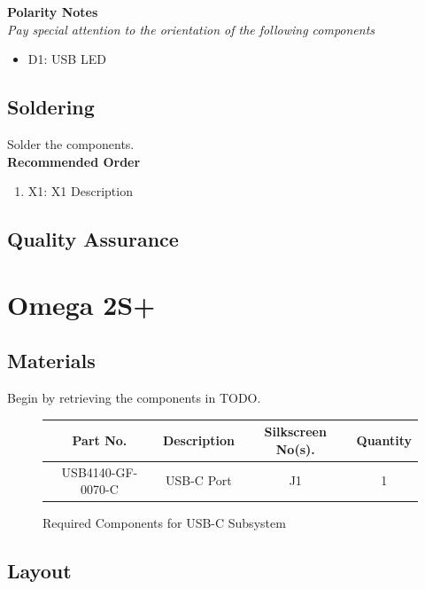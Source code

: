 \documentclass{article}
\begin{document}
\noindent \textbf{Polarity Notes}\\
\noindent \textit{Pay special attention to the orientation of the following components}
\begin{itemize}
  \item D1: USB LED
\end{itemize}

\subsection{Soldering}

Solder the components. \\

\noindent \textbf{Recommended Order}

\begin{enumerate}
  \item X1: X1 Description
\end{enumerate}
\subsection{Quality Assurance}

\section{Omega 2S+}

\subsection{Materials}
Begin by retrieving the components in TODO.

\begin{figure}[H]
    \begin{center}
        \begin{tabular}{ c|c|c|c } 
            \textbf{Part No.} & \textbf{Description} & \textbf{Silkscreen No(s).} & \textbf{Quantity} \\ 
            \hline
            USB4140-GF-0070-C & USB-C Port & J1 & 1 \\ 
        \end{tabular}
    \end{center}
    \caption{Required Components for USB-C Subsystem}
    \label{tbl:TODO-materials}
\end{figure}

\subsection{Layout}
\end{document}
